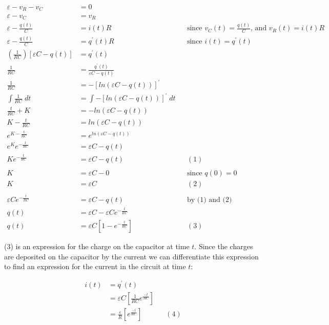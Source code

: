 \documentclass[11pt]{article}
\begin{document}
\begin{align*}
\varepsilon-v_R-v_C&=0 \\ \varepsilon-v_C&=v_R \\ \varepsilon-\frac{q(t)}{C}&=i(t)R &&\text{since $v_C(t)=\frac{q(t)}{C}$, and $v_R(t)=i(t)R$} \\ \varepsilon-\frac{q(t)}{C}&=q^{'}(t)R &&\text{since $i(t)=q^{'}(t)$} \\ \left(\frac{1}{RC}\right)\left[\varepsilon C-q(t)\right]&=q^{'}(t) \\ \frac{1}{RC}&=\frac{q^{'}(t)}{\varepsilon C-q(t)} \\ \frac{1}{RC}&=-\left[ln\left(\varepsilon C-q(t)\right)\right]^{'} \\\int\frac{1}{RC}\;dt&=\int-\left[ln\left(\varepsilon C-q(t)\right)\right]^{'}\;dt \\ \frac{t}{RC}+K&=-ln\left(\varepsilon C-q(t)\right) \\ K-\frac{t}{RC}&=ln\left(\varepsilon C-q(t)\right) \\ e^{K-\frac{t}{RC}}&=e^{ln\left(\varepsilon C-q(t)\right)} \\ e^Ke^{-\frac{t}{RC}}&=\varepsilon C-q(t) \\ Ke^{-\frac{t}{RC}}&=\varepsilon C-q(t)&&(1) \\ \\ K&=\varepsilon C-0&&\text{since $q(0)=0$} \\ K&=\varepsilon C&&(2) \\ \\ \varepsilon Ce^{-\frac{t}{RC}}&=\varepsilon C-q(t)&& \text{by (1) and (2)} \\ q(t)&=\varepsilon C-\varepsilon Ce^{-\frac{t}{RC}} \\ q(t)&=\varepsilon C\left[1-e^{-\frac{t}{RC}}\right]&&(3)
\end{align*}

\newpage

(3) is an expression for the charge on the capacitor at time $t$. Since the charges are deposited on the capacitor by the current we can differentiate this expression to find an expression for the current in the circuit at time $t$: 

\begin{align*}
i(t)&=q^{'}(t)\\&=\varepsilon C\left[\frac{1}{RC}e^{\frac{-t}{RC}}\right]\\&=\frac{\varepsilon}{R}\left[e^{\frac{-t}{RC}}\right]&&(4)
\end{align*}
\end{document}
